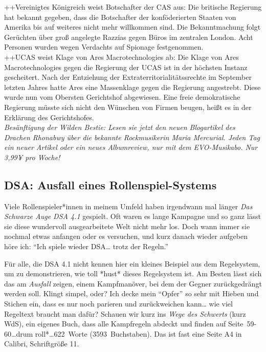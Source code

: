 \documentclass[final]{multiversum}
\begin{document}
++Vereinigtes Königreich weist Botschafter der CAS aus: Die britische Regierung
hat bekannt gegeben, dass die Botschafter der konföderierten Staaten von Amerika
bis auf weiteres nicht mehr willkommen sind. Die Bekanntmachung folgt Gerüchten
über groß angelegte Razzias gegen Büros im zentralen London. Acht Personen
wurden wegen Verdachts auf Spionage festgenommen.\\
\indent ++UCAS weist Klage von Ares Macrotechnologies ab: Die Klage von Ares
Macrotechnologies gegen die Regierung der UCAS ist in der höchsten Instanz
gescheitert. Nach der Entziehung der Extraterritorialitätssrechte im September
letzten Jahres hatte Ares eine Massenklage gegen die Regierung angestrebt. Diese
wurde nun vom Obersten Gerichtshof abgewiesen. Eine freie demokratische
Regierung müsste sich nicht den Wünschen von Firmen beugen, heißt es in der
Erklärung des Gerichtshofes.\\
\indent \textit{Besänftigung der Wilden Bestie: Lesen sie jetzt den neuen
Blogartikel des Drachen Rhonabwy über die bekannte Rockmusikerin Maria
Mercurial. Jeden Tag ein neuer Artikel oder ein neues Albumreview, nur mit dem
EVO-Musikabo. Nur 3,99¥ pro Woche!}


\subsection{DSA: Ausfall eines Rollenspiel-Systems}
 Viele Rollenspieler*innen in meinem Umfeld haben irgendwann mal länger
\emph{Das Schwarze Auge DSA 4.1} gespielt. Oft waren es lange Kampagne und so
ganz lässt sie diese wundervoll ausgearbeitete Welt nicht mehr los. Doch wann
immer sie nochmal etwas anfangen  \textendash{} oder es versuchen, und kurz
danach wieder aufgeben  \textendash{} höre ich: \enquote{Ich spiele wieder
DSA\ldots{} trotz der Regeln.}

Für alle, die DSA 4.1 nicht kennen hier ein kleines Beispiel aus dem
Regelsystem, um zu demonstrieren, wie toll *hust* dieses Regelsystem ist. Am
Besten lässt sich das am \emph{Ausfall} zeigen, einem Kampfmanöver, bei dem der
Gegner zurückgedrängt werden soll. Klingt simpel, oder? Ich decke mein
\enquote{Opfer} so sehr mit Hieben und Stichen ein, dass es nur noch parieren
und zurückweichen kann\ldots{} wie viel Regeltext braucht man dafür? Schauen wir
kurz ins \emph{Wege des Schwerts} (kurz WdS), ein eigenes Buch, dass alle
Kampfregeln abdeckt und finden auf Seite~59-60\ldots *drum roll*\ldots 622~Worte
(3593~Buchstaben). Das ist fast eine Seite A4 in Calibri, Schriftgröße 11.
\end{document}
